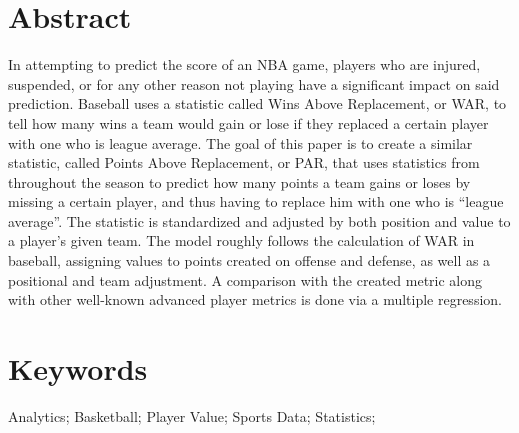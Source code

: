 \documentclass[12pt]{article}
\begin{document}
\section*{Abstract}
In attempting to predict the score of an NBA game, players who are 
injured, suspended, or for any other 
reason not playing have a significant impact on said prediction. Baseball 
uses a statistic called Wins Above 
Replacement, or WAR, to tell how many wins a team would gain or lose if 
they replaced a certain player 
with one who is league average. The goal of this paper is to create a 
similar statistic, called Points Above 
Replacement, or PAR, that uses statistics from throughout the season to 
predict how many points a team 
gains or loses by missing a certain player, and thus having to replace him 
with one who is ``league 
average''. The statistic is standardized and adjusted by both position and 
value to a player's given team. 
The model roughly follows the calculation of WAR in baseball, assigning 
values to points created on offense 
and defense, as well as a positional and team adjustment. A comparison 
with the created metric along with 
other well-known advanced player metrics is done via a multiple 
regression.

\section*{Keywords} 
Analytics; Basketball; Player Value; Sports Data; Statistics; 
\vspace{.12 in}
\end{document}
